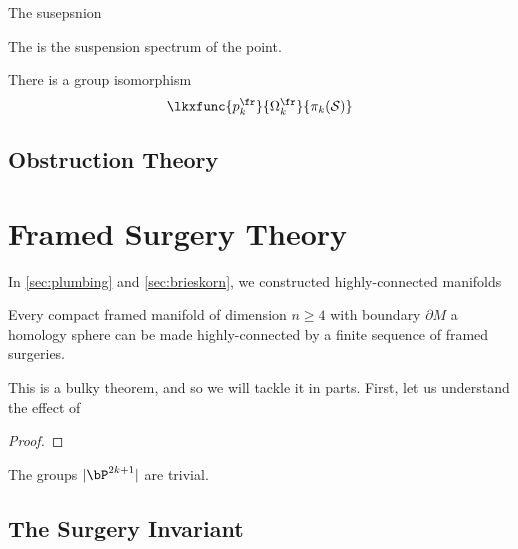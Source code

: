 \begin{definition}
	The susepsnion
\end{definition}

\begin{definition}
	The  is the suspension spectrum of the point.
\end{definition}

\begin{theorem}
	There is a group isomorphism
	\[
		\lkxfunc{p^\fr_k}{\Omega_k^\fr}{\pi_k(\mathcal{S})}
	\]
\end{theorem}

\subsection{Obstruction Theory}

\pagebreak
\section{Framed Surgery Theory}

In \cref{sec:plumbing} and \cref{sec:brieskorn}, we constructed highly-connected manifolds

\begin{theorem}\label{thm:framed-surgery-highly-connected}
	Every compact framed manifold of dimension $n\geq 4$ with boundary $\partial M$ a homology sphere can be made highly-connected by a finite sequence of framed surgeries.
\end{theorem}

This is a bulky theorem, and so we will tackle it in parts. First, let us understand the effect of

\begin{proof}
\end{proof}

\begin{corollary}\label{cor:odd-dimensional-bP-trivial}
	The groups $|\bP^{2k+1}|$ are trivial.
\end{corollary}

\subsection{The Surgery Invariant}\label{sec:surgery-invariant}

\begin{theorem}\label{thm:kervaire-invariant-problem}
\end{theorem}

